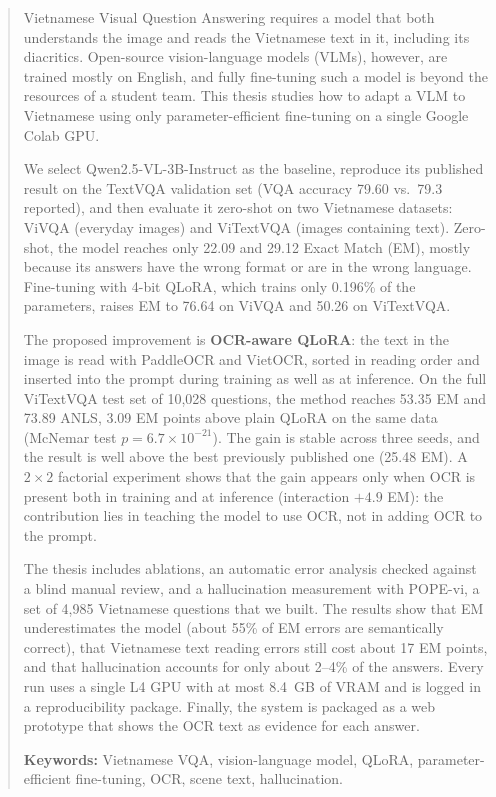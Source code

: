 \begin{abstract}

Vietnamese Visual Question Answering requires a model that both understands the
image and reads the Vietnamese text in it, including its diacritics.
Open-source vision-language models (VLMs), however, are trained mostly on English,
and fully fine-tuning such a model is beyond the resources of a student team. This
thesis studies how to adapt a VLM to Vietnamese using only parameter-efficient
fine-tuning on a single Google Colab GPU.

We select Qwen2.5-VL-3B-Instruct as the baseline, reproduce its published result on
the TextVQA validation set (VQA accuracy 79.60 vs.\ 79.3 reported), and then evaluate
it zero-shot on two Vietnamese datasets: ViVQA (everyday images) and ViTextVQA (images containing text).
Zero-shot, the model reaches only 22.09 and 29.12 Exact Match (EM), mostly because its
answers have the wrong format or are in the wrong language. Fine-tuning with 4-bit
QLoRA, which trains only 0.196\% of the parameters, raises EM to 76.64 on ViVQA and
50.26 on ViTextVQA.

The proposed improvement is \textbf{OCR-aware QLoRA}: the text in the image is read
with PaddleOCR and VietOCR, sorted in reading order and inserted into the prompt
during training as well as at inference. On the full ViTextVQA test set of 10{,}028 questions, the
method reaches 53.35 EM and 73.89 ANLS, 3.09 EM points above plain QLoRA on the same
data (McNemar test $p = 6.7\times10^{-21}$). The gain is stable across three seeds,
and the result is well above the best previously published one (25.48 EM). A $2\times2$ factorial
experiment shows that the gain appears only when OCR is present both in training and
at inference (interaction $+4.9$ EM): the contribution lies in teaching the model to
use OCR, not in adding OCR to the prompt.

The thesis includes ablations, an automatic error analysis checked against a blind
manual review, and a hallucination measurement with POPE-vi, a set of 4{,}985
Vietnamese questions that we built. The results show that EM underestimates the
model (about 55\% of EM errors are semantically correct), that Vietnamese text
reading errors still cost about 17 EM points, and that hallucination accounts for
only about 2--4\% of the answers. Every run uses a single L4 GPU with at most 8.4~GB
of VRAM and is logged in a reproducibility package. Finally, the system is packaged
as a web prototype that shows the OCR text as evidence for each answer.

\vspace{1em}
\noindent\textbf{Keywords:} Vietnamese VQA, vision-language model, QLoRA,
parameter-efficient fine-tuning, OCR, scene text, hallucination.

\end{abstract}
